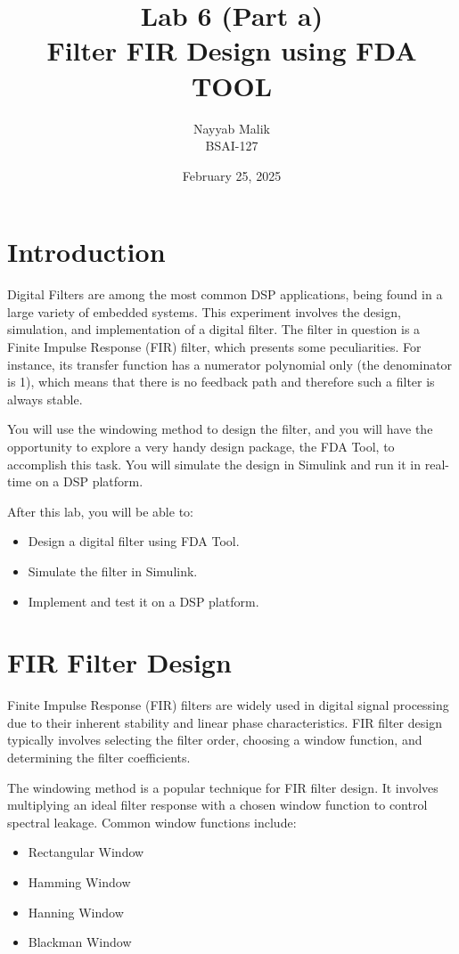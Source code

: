 \documentclass[a4paper,12pt]{article}
\title{\textbf{ Lab 6 (Part a) \\ Filter FIR Design  using FDA TOOL 
}}
\author{Nayyab Malik\\BSAI-127}
\date{February 25, 2025}
\begin{document}
\maketitle
\tableofcontents
\newpage

\section{Introduction}

Digital Filters are among the most common DSP applications, being found in a large variety of embedded
systems. This experiment involves the design, simulation, and implementation of a digital filter. The filter
in question is a Finite Impulse Response (FIR) filter, which presents some peculiarities. For instance, its
transfer function has a numerator polynomial only (the denominator is 1), which means that there is no
feedback path and therefore such a filter is always stable.

You will use the windowing method to design the filter, and you will have the opportunity to explore a very handy design package, the FDA Tool, to accomplish this task. You will simulate the design in Simulink and run it in real-time on a DSP platform.

After this lab, you will be able to:
\begin{itemize}
    \item Design a digital filter using FDA Tool.
    \item Simulate the filter in Simulink.
    \item Implement and test it on a DSP platform.
\end{itemize}

\section{FIR Filter Design}

Finite Impulse Response (FIR) filters are widely used in digital signal processing due to their inherent stability and linear phase characteristics. FIR filter design typically involves selecting the filter order, choosing a window function, and determining the filter coefficients.

The windowing method is a popular technique for FIR filter design. It involves multiplying an ideal filter response with a chosen window function to control spectral leakage. Common window functions include:
\begin{itemize}
    \item Rectangular Window
    \item Hamming Window
    \item Hanning Window
    \item Blackman Window
\end{itemize}
\end{document}
